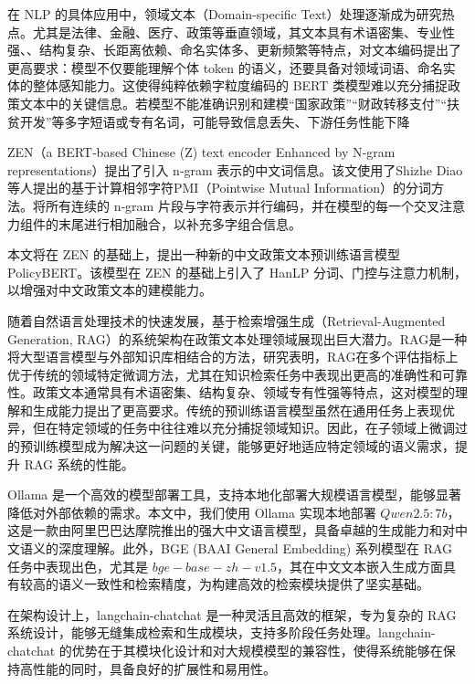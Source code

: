 \documentclass[12pt, a4paper]{ctexart}
\begin{document}
在 NLP 的具体应用中，领域文本（Domain-specific Text）处理逐渐成为研究热点。尤其是法律、金融、医疗、政策等垂直领域，其文本具有术语密集、专业性强、、结构复杂、长距离依赖、命名实体多、更新频繁等特点，对文本编码提出了更高要求：模型不仅要能理解个体 token 的语义，还要具备对领域词语、命名实体的整体感知能力。这使得纯粹依赖字粒度编码的 BERT 类模型难以充分捕捉政策文本中的关键信息。若模型不能准确识别和建模“国家政策”“财政转移支付”“扶贫开发”等多字短语或专有名词，可能导致信息丢失、下游任务性能下降

ZEN（a BERT‑based Chinese (Z) text encoder Enhanced by N‑gram representations）提出了引入 n‑gram 表示的中文词信息\cite{diao-etal-2020-zen}。该文使用了Shizhe Diao 等人提出的基于计算相邻字符PMI（Pointwise Mutual Information）的分词方法\cite{DXSJSZ2021}。将所有连续的 n‑gram 片段与字符表示并行编码，并在模型的每一个交叉注意力组件的末尾进行相加融合，以补充多字组合信息。

本文将在 ZEN 的基础上，提出一种新的中文政策文本预训练语言模型 PolicyBERT。该模型在 ZEN 的基础上引入了 HanLP 分词、门控与注意力机制，以增强对中文政策文本的建模能力。

\vspace{2em} %

随着自然语言处理技术的快速发展，基于检索增强生成（Retrieval-Augmented Generation, RAG）的系统架构在政策文本处理领域展现出巨大潜力。RAG是一种将大型语言模型与外部知识库相结合的方法，研究表明，RAG在多个评估指标上优于传统的领域特定微调方法，尤其在知识检索任务中表现出更高的准确性和可靠性\cite{lakatos2024investigatingperformanceretrievalaugmentedgeneration}。政策文本通常具有术语密集、结构复杂、领域专有性强等特点，这对模型的理解和生成能力提出了更高要求。传统的预训练语言模型虽然在通用任务上表现优异，但在特定领域的任务中往往难以充分捕捉领域知识。因此，在子领域上微调过的预训练模型成为解决这一问题的关键，能够更好地适应特定领域的语义需求，提升 RAG 系统的性能。

Ollama 是一个高效的模型部署工具，支持本地化部署大规模语言模型，能够显著降低对外部依赖的需求。本文中，我们使用 Ollama 实现本地部署 $Qwen2.5:7b$，这是一款由阿里巴巴达摩院推出的强大中文语言模型，具备卓越的生成能力和对中文语义的深度理解\cite{qwen2.5}。此外，BGE (BAAI General Embedding) 系列模型在 RAG 任务中表现出色，尤其是 $ bge-base-zh-v1.5 $，其在中文文本嵌入生成方面具有较高的语义一致性和检索精度，为构建高效的检索模块提供了坚实基础\cite{bgeembedding}。

在架构设计上，langchain-chatchat 是一种灵活且高效的框架，专为复杂的 RAG 系统设计，能够无缝集成检索和生成模块，支持多阶段任务处理\cite{langchainchatchat}。langchain-chatchat 的优势在于其模块化设计和对大规模模型的兼容性，使得系统能够在保持高性能的同时，具备良好的扩展性和易用性。
\end{document}
